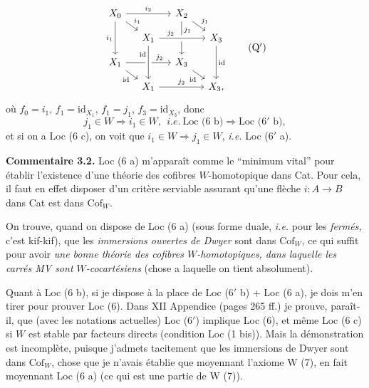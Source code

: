 \documentclass[11pt]{article}
\newcommand{\printedpage}[1]{\marginpar{\footnotesize p.~#1}}
\newcommand{\msp}[1]{\marginpar{\footnotesize [#1]}}
\newcommand{\Cof}{\mathrm{Cof}}
\newcommand{\id}{\mathrm{id}}
\begin{document}
\noindent\printedpage{14}
\[
\begin{tikzcd}[ampersand replacement=\&, row sep=small, column sep=small]
X_0 \arrow[rr, "i_2"] \arrow[dr, "i_1"] \arrow[dd, "i_1"'] \& \& X_2 \arrow[dr, "j_1"] \arrow[dd, "j_1" near start] \& \\
\& X_1 \arrow[rr, "j_2" near start, crossing over] \& \& X_3 \arrow[dd, "\id"] \\
X_1 \arrow[rr, "j_2" near end] \arrow[dr, "\id"'] \& \& X_3 \arrow[dr, "\id"'] \& \\
\& X_1 \arrow[rr, "j_2"] \arrow[from=2-2, "\id"' near start, crossing over] \& \& X_3,
\end{tikzcd}
\tag*{(Q$'$)} %
\]
où $f_0 = i_1$, $f_1 = \id_{X_1}$, $f_1 = j_1$, $f_3 = \id_{X_3}$, donc %
\[
j_1 \in W \Longrightarrow i_1 \in W, \ \ \textit{i.e.}\ \text{Loc (6 b)} \Longrightarrow \text{Loc (6$'$ b)},
\]
et si on a Loc (6 c), on voit que $i_1 \in W \Longrightarrow j_1 \in W$, \textit{i.e.} Loc (6$'$ a).

\textbf{Commentaire 3.2.} Loc (6 a) m'apparaît comme le “minimum vital” pour établir l'existence d'une théorie des cofibres $W$-homotopique dans Cat. Pour cela, il faut en effet disposer d'un critère serviable assurant qu'une flèche $i : A \longrightarrow B$ dans Cat est dans $\Cof_W$.

\msp{page 19}On trouve, quand on dispose de Loc (6 a) (sous forme duale, \textit{i.e.} pour les \textit{fermés,} c'est kif-kif), que les \textit{immersions ouvertes de Dwyer} sont dans $\Cof_W$, ce qui suffit pour avoir \textit{une bonne théorie des cofibres $W$-homotopiques, dans laquelle les carrés MV sont $W$-cocartésiens} (chose a laquelle on tient absolument). %

Quant à Loc (6 b), si je dispose à la place de Loc (6$'$ b) + Loc (6 a), je dois m'en tirer pour prouver Loc (6). Dans XII Appendice (pages 265 ff.) je prouve, paraît-il, que (avec les notations actuelles) Loc (6$'$) implique Loc (6), et même Loc (6 c) si $W$ est stable par facteurs directs (condition Loc (1 bis)). Mais la démonstration est incomplète, puisque j'admets tacitement que les immersions de Dwyer sont dans $\Cof_W$, chose que je n'avais établie que moyennant l'axiome W (7), en fait moyennant Loc (6 a) (ce qui est une partie de W (7)).
\end{document}
